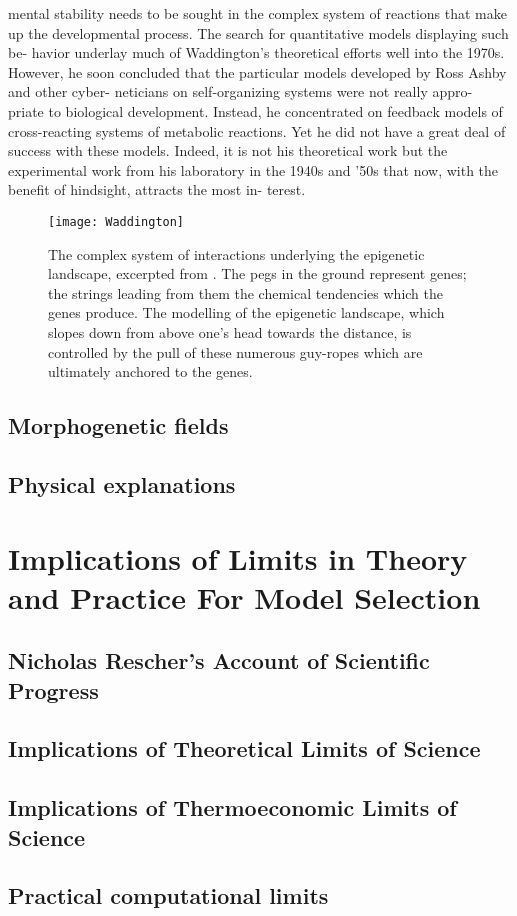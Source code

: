 \begin{longquote}
mental stability needs to be sought in the complex system
of reactions that make up the developmental process.
The search for quantitative models displaying such be-
havior underlay much of Waddington’s theoretical efforts
well into the 1970s. However, he soon concluded that the
particular models developed by Ross Ashby and other cyber-
neticians on self-organizing systems were not really appro-
priate to biological development. Instead, he concentrated
on feedback models of cross-reacting systems of metabolic
reactions. Yet he did not have a great deal of success with
these models. Indeed, it is not his theoretical work but the
experimental work from his laboratory in the 1940s and ’50s
that now, with the benefit of hindsight, attracts the most in-
terest.
\cite[p.117-119]{Keller2000}
\end{longquote}

\begin{figure}
\texttt{[image: Waddington]}
\centering
\caption{The complex system of interactions underlying the epigenetic landscape, excerpted from \cite{Waddington1957}.
The pegs in the ground represent genes; the strings leading from
them the chemical tendencies which the genes produce. The
modelling of the epigenetic landscape, which slopes down from
above one's head towards the distance, is controlled by the pull
of these numerous guy-ropes which are ultimately anchored to
the genes.}
\label{fig:Waddington}
\end{figure}


\subsection{Morphogenetic fields}
\subsection{Physical explanations}
\label{physex}



\section{Implications of Limits in Theory and Practice For Model Selection}
\label{limits}
\subsection{Nicholas Rescher's Account of Scientific Progress}

\subsection{Implications of Theoretical Limits of Science}
\label{theorylimits}
\subsection{Implications of Thermoeconomic Limits of Science}

\subsection{Practical computational limits}
\label{complimits}


